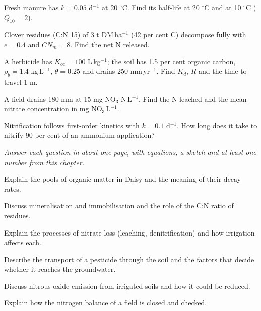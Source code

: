 \begin{exlist}
\item Fresh manure has $k=0.05$ d$^{-1}$ at 20 $^\circ$C. Find its half-life at 20 $^\circ$C and at 10 $^\circ$C ($Q_{10}=2$).
\item Clover residues (C:N 15) of 3 t DM\,ha$^{-1}$ (42 per cent C) decompose fully with $e=0.4$ and $CN_m=8$. Find the net N released.
\item A herbicide has $K_{oc}=100$ L\,kg$^{-1}$; the soil has 1.5 per cent organic carbon, $\rho_b=1.4$ kg\,L$^{-1}$, $\theta=0.25$ and drains 250 mm\,yr$^{-1}$. Find $K_d$, $R$ and the time to travel 1 m.
\item A field drains 180 mm at 15 mg NO$_3$-N\,L$^{-1}$. Find the N leached and the mean nitrate concentration in mg NO$_3$\,L$^{-1}$.
\item Nitrification follows first-order kinetics with $k=0.1$ d$^{-1}$. How long does it take to nitrify 90 per cent of an ammonium application?
\end{exlist}
{\small\itshape Answer each question in about one page, with equations, a sketch and at least one number from this chapter.}\par\vspace{3pt}
\begin{exlist}
\item Explain the pools of organic matter in Daisy and the meaning of their decay rates.
\item Discuss mineralisation and immobilisation and the role of the C:N ratio of residues.
\item Explain the processes of nitrate loss (leaching, denitrification) and how irrigation affects each.
\item Describe the transport of a pesticide through the soil and the factors that decide whether it reaches the groundwater.
\item Discuss nitrous oxide emission from irrigated soils and how it could be reduced.
\item Explain how the nitrogen balance of a field is closed and checked.
\end{exlist}
